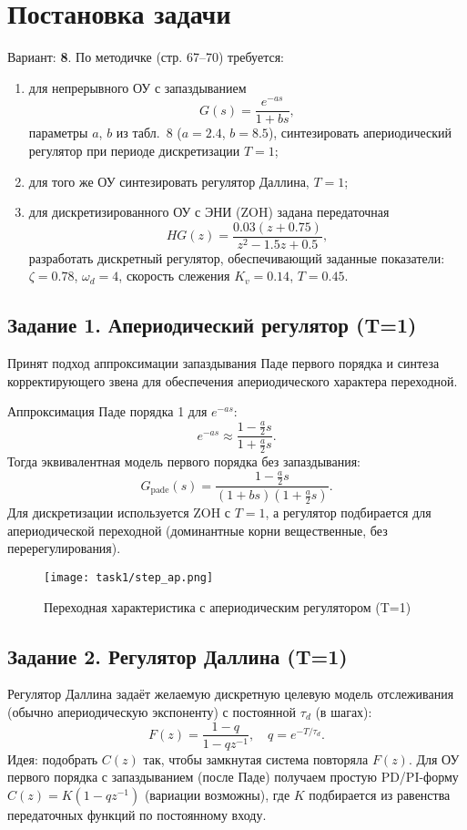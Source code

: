 
\chapter{Постановка задачи}
Вариант: \textbf{8}. По методичке (стр. 67–70) требуется:
\begin{enumerate}
    \item для непрерывного ОУ с запаздыванием
    \[
        G(s) = \frac{e^{-a s}}{1 + b s},
    \]
    параметры $a$, $b$ из табл.~8 ($a=2.4$, $b=8.5$), синтезировать апериодический регулятор при периоде дискретизации $T=1$;
    \item для того же ОУ синтезировать регулятор Даллина, $T=1$;
    \item для дискретизированного ОУ с ЭНИ (ZOH) задана передаточная
    \[
        HG(z)= \frac{0.03(z+0.75)}{z^2 - 1.5 z + 0.5},
    \]
    разработать дискретный регулятор, обеспечивающий заданные показатели: $\zeta=0.78$, $\omega_d=4$, скорость слежения $K_v=0.14$, $T=0.45$.
\end{enumerate}

\section{Задание 1. Апериодический регулятор (T=1)}
Принят подход аппроксимации запаздывания Паде первого порядка и синтеза корректирующего звена для обеспечения апериодического характера переходной.

Аппроксимация Паде порядка 1 для $e^{-a s}$:
\[
    e^{-a s} \approx \frac{1 - \tfrac{a}{2} s}{1 + \tfrac{a}{2} s}.
\]
Тогда эквивалентная модель первого порядка без запаздывания:
\[
    G_{\text{pade}}(s) = \frac{1 - \tfrac{a}{2} s}{(1+b s)(1 + \tfrac{a}{2} s)}.
\]
Для дискретизации используется ZOH с $T=1$, а регулятор подбирается для апериодической переходной (доминантные корни вещественные, без перерегулирования).

\begin{figure}[H]
    \centering
    \texttt{[image: task1/step\_ap.png]}
    \caption{Переходная характеристика с апериодическим регулятором (T=1)}
\end{figure}

% 

\section{Задание 2. Регулятор Даллина (T=1)}
Регулятор Даллина задаёт желаемую дискретную целевую модель отслеживания (обычно апериодическую экспоненту) с постоянной $\tau_d$ (в шагах):
\[
    F(z) = \frac{1 - q}{1 - q z^{-1}}, \quad q = e^{-T/\tau_d}.
\]
Идея: подобрать $C(z)$ так, чтобы замкнутая система повторяла $F(z)$. Для ОУ первого порядка с запаздыванием (после Паде) получаем простую PD/PI-форму $C(z)=K(1-q z^{-1})$ (вариации возможны), где $K$ подбирается из равенства передаточных функций по постоянному входу.

